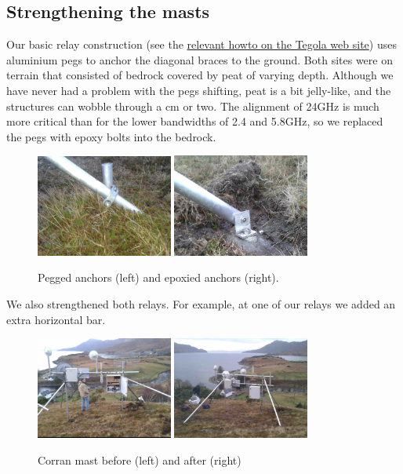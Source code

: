 \documentclass{amsart}
\begin{document}
\subsection{Strengthening the masts}
\label{december-2013-january-2014-strengthening-the-relays}

Our basic relay construction (see the
\href{http://www.tegola.org.uk/howto/relay-construction.html}{relevant
  howto on the Tegola web site}) uses aluminium pegs to anchor the
diagonal braces to the ground. Both sites were on terrain that
consisted of bedrock covered by peat of varying depth. Although we
have never had a problem with the pegs shifting, peat is a bit
jelly-like, and the structures can wobble through a cm or two. The
alignment of 24GHz is much more critical than for the lower bandwidths
of 2.4 and 5.8GHz, so we replaced the pegs with epoxy bolts into the
bedrock.
\begin{figure}[h]
\includegraphics[width=0.4\textwidth]{corran-peg-s}
\includegraphics[width=0.4\textwidth]{corran-epoxy-s}
\caption{Pegged anchors (left) and epoxied anchors (right).}
\end{figure}

We also strengthened both relays. For example, at one of our relays we
added an extra horizontal bar.

\begin{figure}[h]
\includegraphics[width=0.4\textwidth]{corran-before-from-behind-s}
\includegraphics[width=0.4\textwidth]{corran-after-from-behind-s}
\caption{Corran mast before (left) and after (right)}
\end{figure}
\end{document}
